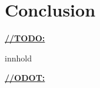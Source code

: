 \chapter{Conclusion}

\underline{\textbf{\LARGE //TODO:}}

innhold

\underline{\textbf{\LARGE //ODOT:}}
